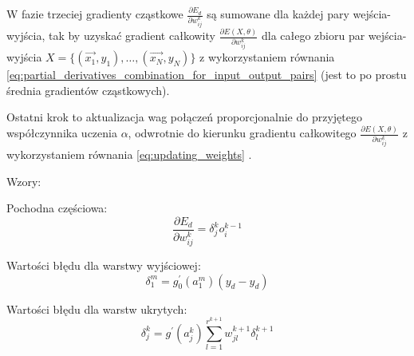 \documentclass[a4paper,12pt]{article}
\numberwithin{figure}{section}
\begin{document}
    W fazie trzeciej gradienty cząstkowe $\frac{\partial E_d}{\partial w_{ij}^k}$ są sumowane dla każdej pary wejścia-wyjścia, tak by uzyskać gradient całkowity $\frac{\partial E(X,\theta)}{\partial w_{ij}^k}$ dla całego zbioru par wejścia-wyjścia $X = \{(\vec{x_1}, y_1),\dotsc,(\vec{x_N}, y_N)\}$ z wykorzystaniem równania \ref{eq:partial_derivatives_combination_for_input_output_pairs} (jest to po prostu średnia gradientów cząstkowych).

    \bigskip

    Ostatni krok to aktualizacja wag połączeń proporcjonalnie do przyjętego współczynnika uczenia $\alpha$, odwrotnie do kierunku gradientu całkowitego $\frac{\partial E(X,\theta)}{\partial w_{ij}^k}$ z wykorzystaniem równania \ref{eq:updating_weights} \cite{BackpropagationBrilliant}.

    \bigskip

    Wzory:

    \bigskip

    \noindent
    \begin{minipage}[H]{\textwidth}
        \setlength\parindent{17pt} Pochodna częściowa: \\
        \begin{equation}
            \label{eq:error_func_partial_derivatives}
            \frac{\partial E_d}{\partial w_{ij}^k} = \delta_j^k o_i^{k-1}
        \end{equation}
    \end{minipage}

    \smallskip

    \noindent
    \begin{minipage}[H]{\textwidth}
        \setlength\parindent{17pt} Wartości błędu dla warstwy wyjściowej: \\
        \begin{equation}
            \label{eq:final_layer_error_term}
            \delta_1^m = g_0^{\prime} (a_1^m) (\widehat{y_d} - y_d)
        \end{equation}
    \end{minipage}

    \smallskip

    \noindent
    \begin{minipage}[H]{\textwidth}
        \setlength\parindent{17pt} Wartości błędu dla warstw ukrytych: \\
        \begin{equation}
            \label{eq:hidden_layer_error_term}
            \delta_j^k = g^{\prime} (a_j^k) \displaystyle\sum_{l=1}^{r^{k+1}} w_{jl}^{k+1} \delta_l^{k+1}
        \end{equation}
    \end{minipage}
\end{document}
